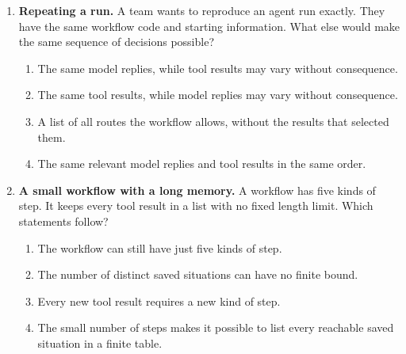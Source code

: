 \begin{enumerate}[start=1,itemsep=0.7\baselineskip]
\item\label{exercise:3} \begin{minipage}[t]{\linewidth}
\textbf{Repeating a run.} A team wants to reproduce an agent run exactly. They have the same workflow code and starting information. What else would make the same sequence of decisions possible?
\begin{enumerate}[label=\textnormal{(\Alph*)},leftmargin=*,itemsep=0pt]
\item The same model replies, while tool results may vary without consequence.
\item The same tool results, while model replies may vary without consequence.
\item A list of all routes the workflow allows, without the results that selected them.
\item The same relevant model replies and tool results in the same order.
\end{enumerate}
\end{minipage}

\item\label{exercise:4} \begin{minipage}[t]{\linewidth}
\textbf{A small workflow with a long memory.} A workflow has five kinds of step. It keeps every tool result in a list with no fixed length limit. Which statements follow?
\begin{enumerate}[label=\textnormal{(\Alph*)},leftmargin=*,itemsep=0pt]
\item The workflow can still have just five kinds of step.
\item The number of distinct saved situations can have no finite bound.
\item Every new tool result requires a new kind of step.
\item The small number of steps makes it possible to list every reachable saved situation in a finite table.
\end{enumerate}
\end{minipage}


\end{enumerate}
